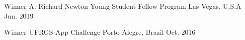 

\begin{cvhonors}
    \cvhonor
    {Winner} %
    {A. Richard Newton Young Student Fellow Program} %
    {Las Vegas, U.S.A} %
    {Jun. 2019} %
    
    \cvhonor
    {Winner} %
    {UFRGS App Challenge} %
    {Porto Alegre, Brazil} %
    {Oct. 2016} %
    
\end{cvhonors}